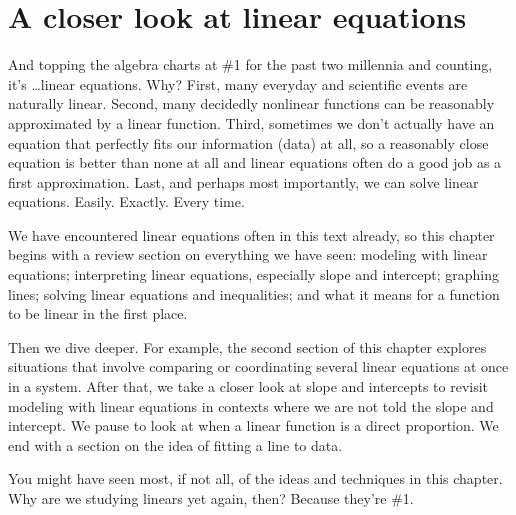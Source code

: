 

\chapter{A closer look at linear equations}

And topping the algebra charts at \#1 for the past two millennia and counting, it's \ldots linear equations.  Why?  First, many everyday and scientific events are naturally linear.  Second, many decidedly nonlinear functions  can be reasonably approximated by a linear function. Third, sometimes we don't actually have an equation that perfectly fits our information (data) at all, so a reasonably close equation is better than none at all and linear equations often do a good job as a first approximation.  Last, and perhaps most importantly, we can solve linear equations.  Easily.  Exactly.  Every time.

We have encountered linear equations often in this text already, so this chapter begins with a review section on everything we have seen:  modeling with linear equations; interpreting linear equations, especially slope and intercept; graphing lines; solving linear equations and inequalities; and what it means for a function to be linear in the first place.

Then we dive deeper.  For example, the second section of this chapter explores  situations that involve comparing or coordinating several linear equations at once in a system.  After that, we take a closer look at slope and intercepts to revisit modeling with linear equations in contexts where we are not told the slope and intercept. We pause to look at when a linear function is a direct proportion.  We end with a section on the idea of fitting a line to data.

You might have seen most, if not all, of the ideas and techniques in this chapter.  Why are we studying linears yet again, then?  Because they're \#1. 

